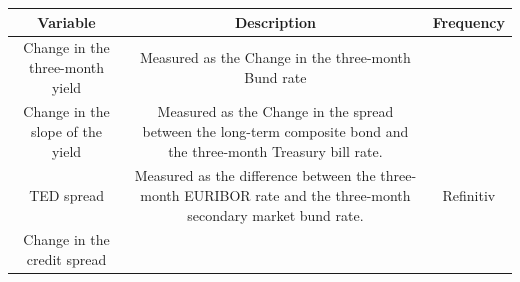 \documentclass[
  10pt,
]{article}
\begin{document}
\begin{longtable}[]{@{}ccc@{}}
\toprule
\begin{minipage}[b]{0.36\columnwidth}\centering
Variable\strut
\end{minipage} & \begin{minipage}[b]{0.32\columnwidth}\centering
Description\strut
\end{minipage} & \begin{minipage}[b]{0.24\columnwidth}\centering
Frequency\strut
\end{minipage}\tabularnewline
\midrule
\endhead
\begin{minipage}[t]{0.36\columnwidth}\centering
Change in the three-month yield\strut
\end{minipage} & \begin{minipage}[t]{0.32\columnwidth}\centering
Measured as the Change in the three-month Bund rate\strut
\end{minipage} & \begin{minipage}[t]{0.24\columnwidth}\centering
\strut
\end{minipage}\tabularnewline
\begin{minipage}[t]{0.36\columnwidth}\centering
Change in the slope of the yield\strut
\end{minipage} & \begin{minipage}[t]{0.32\columnwidth}\centering
Measured as the Change in the spread between the long-term composite
bond and the three-month Treasury bill rate.\strut
\end{minipage} & \begin{minipage}[t]{0.24\columnwidth}\centering
\strut
\end{minipage}\tabularnewline
\begin{minipage}[t]{0.36\columnwidth}\centering
TED spread\strut
\end{minipage} & \begin{minipage}[t]{0.32\columnwidth}\centering
Measured as the difference between the three-month EURIBOR rate and the
three-month secondary market bund rate.\strut
\end{minipage} & \begin{minipage}[t]{0.24\columnwidth}\centering
Refinitiv\strut
\end{minipage}\tabularnewline
\begin{minipage}[t]{0.36\columnwidth}\centering
Change in the credit spread\strut
\end{minipage} & \begin{minipage}[t]{0.32\columnwidth}\centering

\end{minipage}
\end{longtable}
\end{document}
